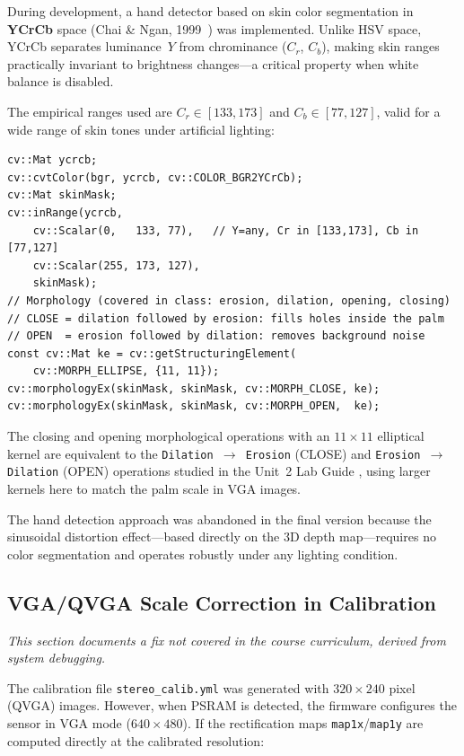 \documentclass[12pt, a4paper]{article}
\begin{document}
During development, a hand detector based on skin color segmentation in
\textbf{YCrCb} space (Chai \& Ngan, 1999~\cite{chai1999face}) was implemented.
Unlike HSV space, YCrCb separates luminance~$Y$ from chrominance ($C_r$, $C_b$),
making skin ranges practically invariant to brightness changes---a critical property
when white balance is disabled.

The empirical ranges used are $C_r \in [133, 173]$ and $C_b \in [77, 127]$,
valid for a wide range of skin tones under artificial lighting:

\begin{lstlisting}[style=cppstyle, caption={YCrCb segmentation in HandDetector.cpp.}]
cv::Mat ycrcb;
cv::cvtColor(bgr, ycrcb, cv::COLOR_BGR2YCrCb);
cv::Mat skinMask;
cv::inRange(ycrcb,
    cv::Scalar(0,   133, 77),   // Y=any, Cr in [133,173], Cb in [77,127]
    cv::Scalar(255, 173, 127),
    skinMask);
// Morphology (covered in class: erosion, dilation, opening, closing)
// CLOSE = dilation followed by erosion: fills holes inside the palm
// OPEN  = erosion followed by dilation: removes background noise
const cv::Mat ke = cv::getStructuringElement(
    cv::MORPH_ELLIPSE, {11, 11});
cv::morphologyEx(skinMask, skinMask, cv::MORPH_CLOSE, ke);
cv::morphologyEx(skinMask, skinMask, cv::MORPH_OPEN,  ke);
\end{lstlisting}

The closing and opening morphological operations with an $11\times11$ elliptical
kernel are equivalent to the \texttt{Dilation $\to$ Erosion} (CLOSE) and
\texttt{Erosion $\to$ Dilation} (OPEN) operations studied in the Unit~2 Lab Guide
\cite{robles2026guia2}, using larger kernels here to match the palm scale in VGA images.

\noindent The hand detection approach was abandoned in the final version because the
sinusoidal distortion effect---based directly on the 3D depth map---requires no color
segmentation and operates robustly under any lighting condition.

\subsection{VGA/QVGA Scale Correction in Calibration}
\label{sec:vgafix}

\emph{This section documents a fix not covered in the course curriculum, derived
from system debugging.}

The calibration file \texttt{stereo\_calib.yml} was generated with
$320\times240$ pixel (QVGA) images. However, when PSRAM is detected, the firmware
configures the sensor in VGA mode ($640\times480$). If the rectification maps
\texttt{map1x}/\texttt{map1y} are computed directly at the calibrated resolution:
\end{document}
